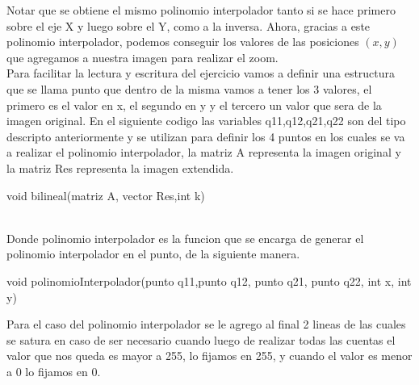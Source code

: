 Notar que se obtiene el mismo polinomio interpolador tanto si se hace primero sobre el eje X y luego sobre el Y, como a la inversa. Ahora, gracias a este polinomio interpolador, podemos conseguir los valores de las posiciones $(x,y)$ que agregamos a nuestra imagen para realizar el zoom.\\
Para facilitar la lectura y escritura del ejercicio vamos a definir una estructura que se llama punto que dentro de la misma vamos a tener los 3 valores, el primero es el valor en x, el segundo en y y el tercero un valor que sera de la imagen original. 
En el siguiente codigo las variables q11,q12,q21,q22 son del tipo descripto anteriormente y se utilizan para definir los 4 puntos en los cuales se va a realizar el polinomio interpolador, la matriz A representa la imagen original y la matriz Res representa la imagen extendida.
\begin{algorithm}
\begin{algorithmic}[1]\parskip=1mm
\caption{void bilineal(matriz A, vector Res,int k)}
\end{algorithmic}
\end{algorithm}\\
Donde polinomio interpolador es la funcion que se encarga de generar el polinomio interpolador en el punto, de la siguiente manera.
\begin{algorithm}
\begin{algorithmic}[1]\parskip=1mm
\caption{void polinomioInterpolador(punto q11,punto q12, punto q21, punto q22, int x, int y)}
\end{algorithmic}
\end{algorithm}
Para el caso del polinomio interpolador se le agrego al final 2 lineas de las cuales se satura en caso de ser necesario cuando luego de realizar todas las cuentas el valor que nos queda es mayor a 255, lo fijamos en 255, y cuando el valor es menor a 0 lo fijamos en 0.
